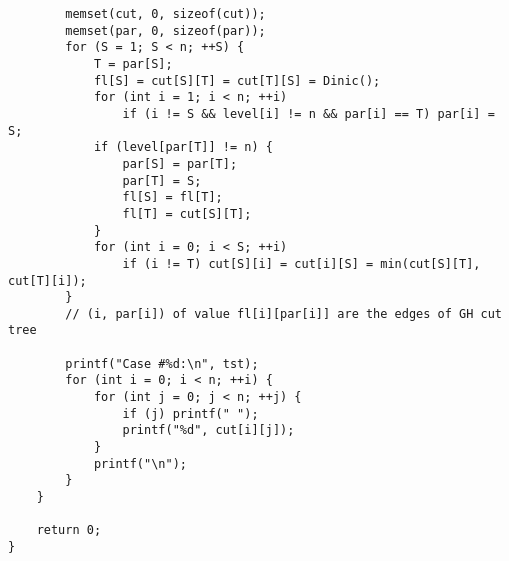 \begin{verbatim}
		memset(cut, 0, sizeof(cut));
		memset(par, 0, sizeof(par));
		for (S = 1; S < n; ++S) {
			T = par[S];
			fl[S] = cut[S][T] = cut[T][S] = Dinic();
			for (int i = 1; i < n; ++i)
				if (i != S && level[i] != n && par[i] == T) par[i] = S;
			if (level[par[T]] != n) {
				par[S] = par[T];
				par[T] = S;
				fl[S] = fl[T];
				fl[T] = cut[S][T];
			}
			for (int i = 0; i < S; ++i)
				if (i != T) cut[S][i] = cut[i][S] = min(cut[S][T], cut[T][i]);
		}
		// (i, par[i]) of value fl[i][par[i]] are the edges of GH cut tree

		printf("Case #%d:\n", tst);
		for (int i = 0; i < n; ++i) {
			for (int j = 0; j < n; ++j) {
				if (j) printf(" ");
				printf("%d", cut[i][j]);
			}
			printf("\n");
		}
	}

	return 0;
}
\end{verbatim}

